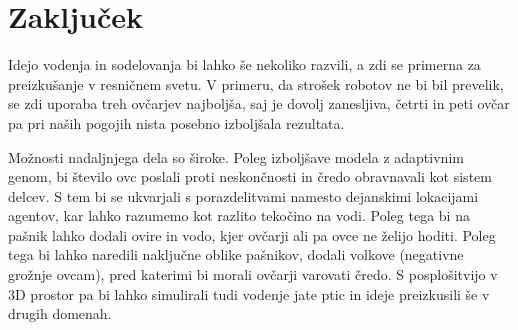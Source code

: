 \section{Zaključek}

Idejo vodenja in sodelovanja bi lahko še nekoliko razvili, a zdi se primerna za preizkušanje v resničnem svetu. V primeru, da strošek robotov ne bi bil prevelik, se zdi uporaba treh ovčarjev najboljša, saj je dovolj zanesljiva, četrti in peti ovčar pa pri naših pogojih nista posebno izboljšala rezultata.

Možnosti nadaljnjega dela so široke. Poleg izboljšave modela z adaptivnim genom, bi število ovc poslali proti neskončnosti in čredo obravnavali kot sistem delcev. S tem bi se ukvarjali s porazdelitvami namesto dejanskimi lokacijami agentov, kar lahko razumemo kot razlito tekočino na vodi. Poleg tega bi na pašnik lahko dodali ovire in vodo, kjer ovčarji ali pa ovce ne želijo hoditi. Poleg tega bi lahko naredili naključne oblike pašnikov, dodali volkove (negativne grožnje ovcam), pred katerimi bi morali ovčarji varovati čredo. S posplošitvijo v 3D prostor pa bi lahko simulirali tudi vodenje jate ptic in ideje preizkusili še v drugih domenah.
